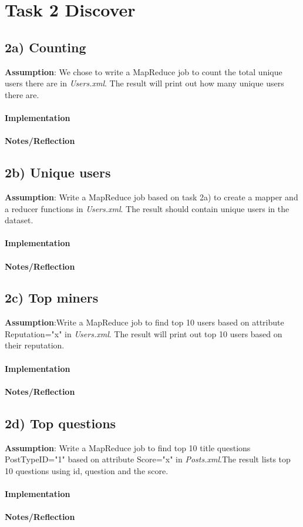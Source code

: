 \documentclass[fleqn,10pt]{wlscirep}
\begin{document}
\section*{Task 2 Discover}

\subsection*{2a) Counting }
\textbf{Assumption}: We chose to write a MapReduce job to count the total unique users there are in \textit{Users.xml}. The result will print out how many unique users there are.\\ \\
\textbf{Implementation}  \\ \\
\textbf{Notes/Reflection}


\subsection*{2b) Unique users }
\textbf{Assumption}: Write a MapReduce job based on task 2a) to create a mapper  and a reducer functions in \textit{Users.xml}. The result should contain unique users in the dataset.  \\ \\
\textbf{Implementation}  \\ \\
\textbf{Notes/Reflection}
% 

\subsection*{2c) Top miners }
\textbf{Assumption}:Write a MapReduce job to find top 10 users based on attribute Reputation="x" in \textit{Users.xml}. The result will print out top 10 users based on their reputation. \\ \\
\textbf{Implementation}  \\ \\
\textbf{Notes/Reflection}


\subsection*{2d) Top questions }
\textbf{Assumption}: Write a MapReduce job to find top 10 title questions PostTypeID="1"  based on attribute Score="x" in \textit{Posts.xml}.The result lists top 10 questions using id, question and the score.\\ \\
\textbf{Implementation}  \\ \\
\textbf{Notes/Reflection}
%
\end{document}
